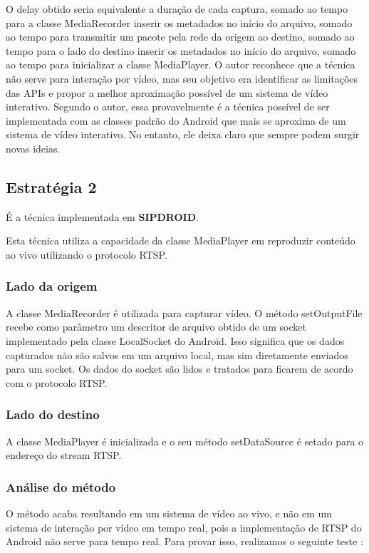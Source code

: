 \documentclass{acm_proc_article-sp}
\newcommand{\todo}[1]{\textcolor[rgb]{1.00,0.00,0.00}{\bf \uppercase{#1}}}
\begin{document}
O delay obtido seria equivalente a duração de cada captura, somado ao tempo para a classe MediaRecorder inserir os metadados no início do arquivo, somado ao tempo para transmitir um pacote pela rede da origem ao destino, somado ao tempo para o lado do destino inserir os metadados no início do arquivo, somado ao tempo para inicializar a classe MediaPlayer. O autor reconhece que a técnica não serve para interação por vídeo, mas seu objetivo era identificar as limitações das APIs e propor a melhor aproximação possível de um sistema de vídeo interativo. Segundo o autor, essa provavelmente é a técnica possível de ser implementada com as classes padrão do Android que mais se aproxima de um sistema de vídeo interativo. No entanto, ele deixa claro que sempre podem surgir novas ideias.

\subsection{Estratégia 2}
É a técnica implementada em \todo{sipdroid}.

Esta técnica utiliza a capacidade da classe MediaPlayer em reproduzir conteúdo ao vivo utilizando o protocolo RTSP.

\subsubsection{Lado da origem}
A classe MediaRecorder é utilizada para capturar vídeo. O método setOutputFile recebe como parâmetro um descritor de arquivo obtido de um socket implementado pela classe LocalSocket do Android. Isso significa que os dados capturados não são salvos em um arquivo local, mas sim diretamente enviados para um socket. Os dados do socket são lidos e tratados para ficarem de acordo com o protocolo RTSP.

\subsubsection{Lado do destino}
A classe MediaPlayer é inicializada e o seu método setDataSource é setado para o endereço do stream RTSP.

\subsubsection{Análise do método}
O método acaba resultando em um sistema de vídeo ao vivo, e não em um sistema de interação por vídeo em tempo real, pois a implementação de RTSP do Android não serve para tempo real. Para provar isso, realizamos o seguinte teste :
\end{document}

